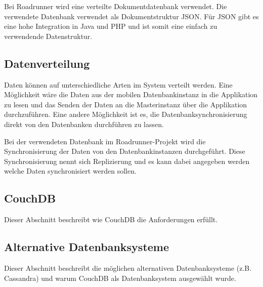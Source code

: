Bei Roadrunner wird eine verteilte Dokumentdatenbank verwendet. Die verwendete Datenbank verwendet als Dokumentstruktur JSON. Für JSON gibt es eine hohe Integration in Java und PHP und ist somit eine einfach zu verwendende Datenstruktur.

\subsection{Datenverteilung}

Daten können auf unterschiedliche Arten im System verteilt werden. Eine Möglichkeit wäre die Daten aus der mobilen Datenbankinstanz in die Applikation zu lesen und das Senden der Daten an die Masterinstanz über die Applikation durchzuführen. Eine andere Möglichkeit ist es, die Datenbanksynchronisierung direkt von den Datenbanken durchführen zu lassen. 

Bei der verwendeten Datenbank im Roadrunner-Projekt wird die Synchronisierung der Daten von den Datenbankinstanzen durchgeführt. Diese Synchronisierung nennt sich Replizierung und es kann dabei angegeben werden welche Daten synchronisiert werden sollen.

\subsection{CouchDB}

Dieser Abschnitt beschreibt wie CouchDB die Anforderungen erfüllt.

\subsection{Alternative Datenbanksysteme}

Dieser Abschnitt beschreibt die möglichen alternativen Datenbanksysteme (z.B. Cassandra) und warum CouchDB als Datenbanksystem ausgewählt wurde.
